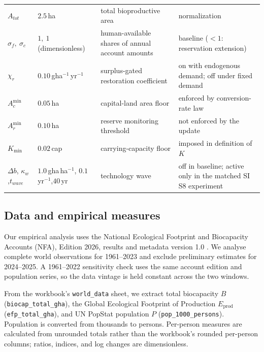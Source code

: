 \documentclass[preprint,12pt,authoryear]{elsarticle}
\newcommand{\Acmin}{A_c^{\min}}
\begin{document}
\begin{table}[!htbp]
\begin{tabularx}{\textwidth}{@{}>{\raggedright\arraybackslash}p{} >{\raggedright\arraybackslash}p{} >{\raggedright\arraybackslash}X >{\raggedright\arraybackslash}p{}@{}}
$A_{tot}$ & $2.5$\,ha & total bioproductive area & normalization \\
$\sigma_f,\ \sigma_c$ & $1,\ 1$ (dimensionless) & human-available shares of annual account amounts & baseline ($<1$: reservation extension) \\
$\chi_r$ & $0.10$\,gha$^{-1}$\,yr$^{-1}$ & surplus-gated restoration coefficient & on with endogenous demand; off under fixed demand \\
$\Acmin$ & $0.05$\,ha & capital-land area floor & enforced by conversion-rate law \\
$A_r^{\min}$ & $0.10$\,ha & reserve monitoring threshold & not enforced by the update \\
$K_{\min}$ & $0.02$\,cap & carrying-capacity floor & imposed in definition of $K$ \\
$\Delta b$, $\kappa_w$,\newline $t_{wave}$ & $1.0$\,gha\,ha$^{-1}$, $0.1$\,yr$^{-1}$,\newline $40$\,yr & technology wave & off in baseline; active only in the matched SI S8 experiment \\
\bottomrule
\end{tabularx}
\end{table}

\subsection{Data and empirical measures}\label{sec:data}

Our empirical analysis uses the National Ecological Footprint and Biocapacity Accounts (NFA), Edition 2026, results and metadata version 1.0 \citep{Lo2026NFA}. We analyse complete world observations for 1961--2023 and exclude preliminary estimates for 2024--2025. A 1961--2022 sensitivity check uses the same account edition and population series, so the data vintage is held constant across the two windows.

From the workbook's \texttt{world\_data} sheet, we extract total biocapacity $B$ (\texttt{biocap\_total\_gha}), the Global Ecological Footprint of Production $E_{\mathrm{prod}}$ (\texttt{efp\_total\_gha}), and UN PopStat population $P$ (\texttt{pop\_1000\_persons}). Population is converted from thousands to persons. Per-person measures are calculated from unrounded totals rather than the workbook's rounded per-person columns; ratios, indices, and log changes are dimensionless.
\end{document}
